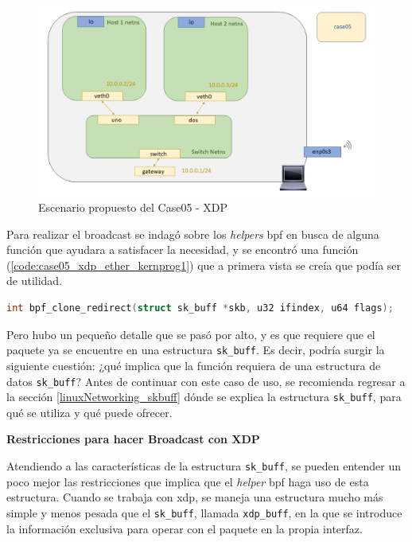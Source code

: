 \begin{figure}[ht]
    \centering
    \includegraphics[width=16cm]{archivos/img/dev/xdp/case05/scenario_02.png}
    \caption{Escenario propuesto del Case05 - XDP}
    \label{fig:case05_xdp_ether_scenario2}
\end{figure}

Para realizar el broadcast se indagó sobre los \textit{helpers} \gls{bpf} en busca de alguna función que ayudara a satisfacer la necesidad, y se encontró una función (\ref{code:case05_xdp_ether_kernprog1}) que a primera vista se creía que podía ser de utilidad.

\begin{lstlisting}[language=C, style=C-color, caption={Helper BPF para realizar un Broadcast - Case05},label=code:case05_xdp_ether_kernprog1]
    int bpf_clone_redirect(struct sk_buff *skb, u32 ifindex, u64 flags);
\end{lstlisting}
\vspace{0.2cm}

Pero hubo un pequeño detalle que se pasó por alto, y es que requiere que el paquete ya se encuentre en una estructura \texttt{sk\_buff}. Es decir, podría surgir la siguiente cuestión: ¿qué implica que la función requiera de una estructura de datos \texttt{sk\_buff}? Antes de continuar con este caso de uso, se recomienda regresar a la sección \ref{linuxNetworking_skbuff} dónde se explica la estructura \texttt{sk\_buff}, para qué se utiliza y qué puede ofrecer.


\vspace{1cm}
\textbf{Restricciones para hacer Broadcast con XDP}\\
\par

Atendiendo a las características de la estructura \texttt{sk\_buff}, se pueden entender un poco mejor las restricciones que implica que el \textit{helper} \gls{bpf} haga uso de esta estructura. Cuando se trabaja con \gls{xdp}, se maneja una estructura mucho más simple y menos pesada que el \texttt{sk\_buff}, llamada \texttt{xdp\_buff}, en la que se introduce la información exclusiva para operar con el paquete en la propia interfaz.\\
\par

